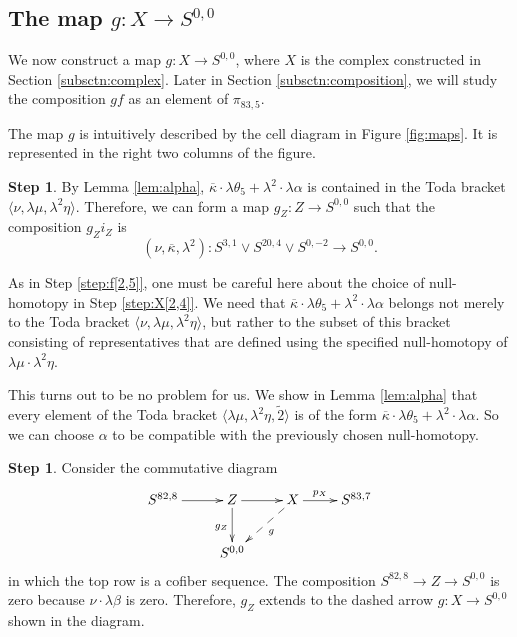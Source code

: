 \documentclass{amsart}
\theoremstyle{definition}
\newtheorem{step}[thm]{Step}
\newcommand{\map}{\rightarrow}
\newcommand{\Xzerofour}{Z}
\newcommand{\hsf}{\widetilde{2}}
\newcommand{\kappabar}{\overline{\kappa}}
\begin{document}
\subsection{The map $g: X \map S^{0,0}$}
\label{subsctn:g}

We now construct a map
$g: X \map S^{0,0}$, where $X$ is the complex constructed
in Section \ref{subsctn:complex}.
Later in Section \ref{subsctn:composition},
we will study the composition $gf$ as an element of $\pi_{83,5}$.

The map $g$ is intuitively described by
the cell diagram in Figure \ref{fig:maps}.
It is represented in the right two columns of the figure.

\begin{step}
\label{step:g[0,4]}
By Lemma \ref{lem:alpha}, 
$\kappabar \cdot \lambda \theta_5 + \lambda^2 \cdot \lambda \alpha$
is contained in the Toda bracket
$\langle \nu, \lambda \mu, \lambda^2 \eta \rangle$.
Therefore, we can form a map $g_\Xzerofour:\Xzerofour \map S^{0,0}$ 
such that the composition $g_\Xzerofour i_\Xzerofour$
is 
\[
(\nu, \kappabar, \lambda^2): S^{3,1} \vee S^{20,4} \vee S^{0,-2} \rightarrow S^{0,0}.
\]

As in Step \ref{step:f[2,5]},
one must be careful here about the choice of null-homotopy
in Step \ref{step:X[2,4]}.  We need that 
$\kappabar \cdot \lambda \theta_5 + \lambda^2 \cdot \lambda \alpha$
belongs not merely to the Toda bracket 
$\langle \nu, \lambda \mu, \lambda^2 \eta \rangle$, but rather to
the subset of this bracket consisting of representatives that are
defined using the specified null-homotopy
of $\lambda \mu \cdot \lambda^2 \eta$.

This turns out to be no problem for us.  We show in
Lemma \ref{lem:alpha} that every element of the Toda bracket
$\langle \lambda \mu, \lambda^2 \eta, \hsf \rangle$ is of the form
$\kappabar \cdot \lambda \theta_5 + \lambda^2 \cdot \lambda \alpha$.
So we can choose $\alpha$
to be compatible with the previously chosen null-homotopy.
\end{step}

\begin{step}
\label{step:g[0,5]}
Consider the commutative diagram
\[
\xymatrix{
S^{82,8} \ar[r] & \Xzerofour \ar[r] \ar[d]_{g_\Xzerofour} & X \ar[r]^-{p_X} \ar@{-->}[dl]^-{g} & S^{83,7} \\
 & S^{0,0} & &
}
\]
in which the top row is a cofiber sequence.
The composition $S^{82,8} \map \Xzerofour \map S^{0,0}$
is zero because $\nu \cdot \lambda \beta$ is zero.
Therefore, $g_\Xzerofour$ extends to the dashed arrow
$g: X \map S^{0,0}$ shown in the diagram.
\end{step}
\end{document}
